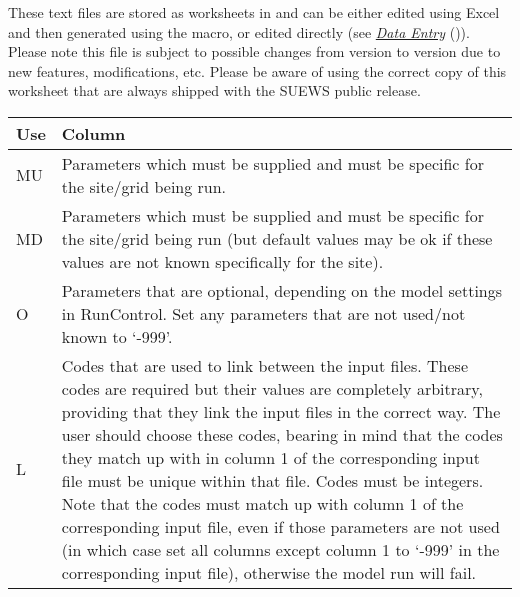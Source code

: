 \documentclass[letterpaper,10pt,english]{sphinxmanual}
\begin{document}
These text files are stored as worksheets in
 and can be either edited using Excel and then
generated using the macro, or edited directly (see {\hyperref[\detokenize{input_files/SUEWS_SiteInfo/SUEWS_SiteInfo:Data_Entry}]{\emph{Data
Entry}}} ()). Please note this file is subject to possible
changes from version to version due to new features, modifications, etc.
Please be aware of using the correct copy of this worksheet that are
always shipped with the SUEWS public release.


\begin{savenotes}\sphinxattablestart
\centering
\begin{tabulary}{\linewidth}[t]{|T|T|}
\hline
\sphinxstyletheadfamily 
Use
&\sphinxstyletheadfamily 
Column
\\
\hline
MU
&
Parameters which must be supplied
and must be specific for the
site/grid being run.
\\
\hline
MD
&
Parameters which must be supplied
and must be specific for the
site/grid being run (but default
values may be ok if these values
are not known specifically for
the site).
\\
\hline
O
&
Parameters that are optional,
depending on the model settings
in RunControl. Set any parameters
that are not used/not known to
‘-999’.
\\
\hline
L
&
Codes that are used to link
between the input files. These
codes are required but their
values are completely arbitrary,
providing that they link the
input files in the correct way.
The user should choose these
codes, bearing in mind that the
codes they match up with in
column 1 of the corresponding
input file must be unique within
that file. Codes must be
integers. Note that the codes
must match up with column 1 of
the corresponding input file,
even if those parameters are not
used (in which case set all
columns except column 1 to ‘-999’
in the corresponding input file),
otherwise the model run will
fail.
\\
\hline
\end{tabulary}
\par
\sphinxattableend\end{savenotes}
\end{document}
